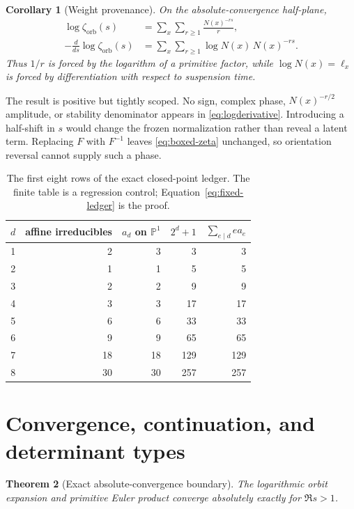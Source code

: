 \documentclass[11pt]{article}
\newtheorem{theorem}{Theorem}
\newtheorem{corollary}[theorem]{Corollary}
\theoremstyle{definition}
\theoremstyle{remark}
\begin{document}
\begin{corollary}[Weight provenance]
\label{cor:weights}
On the absolute-convergence half-plane,
\begin{align}
  \log\zeta_{\mathrm{orb}}(s)
   &=\sum_x\sum_{r\geq1}\frac{N(x)^{-rs}}r,
  \label{eq:logzeta}\\
  -\frac{d}{ds}\log\zeta_{\mathrm{orb}}(s)
   &=\sum_x\sum_{r\geq1}\log N(x)\,N(x)^{-rs}.
  \label{eq:logderivative}
\end{align}
Thus \(1/r\) is forced by the logarithm of a primitive factor, while
\(\log N(x)=\ell_x\) is forced by differentiation with respect to suspension
time.
\end{corollary}

The result is positive but tightly scoped.  No sign, complex phase,
\(N(x)^{-r/2}\) amplitude, or stability denominator appears in
\eqref{eq:logderivative}.  Introducing a half-shift in \(s\) would change the
frozen normalization rather than reveal a latent term.  Replacing \(F\) with
\(F^{-1}\) leaves \eqref{eq:boxed-zeta} unchanged, so orientation reversal
cannot supply such a phase.

\begin{table}[t]
\centering
\caption{The first eight rows of the exact closed-point ledger.  The finite
table is a regression control; Equation~\eqref{eq:fixed-ledger} is the proof.}
\label{tab:ledger}
\small
\begin{tabular}{@{}rrrrr@{}}
\toprule
\(d\) & affine irreducibles & \(a_d\) on \(\mathbb P^1\) & \(2^d+1\) & \(\sum_{e\mid d}e a_e\)\\
\midrule
1 & 2 & 3 & 3 & 3\\
2 & 1 & 1 & 5 & 5\\
3 & 2 & 2 & 9 & 9\\
4 & 3 & 3 & 17 & 17\\
5 & 6 & 6 & 33 & 33\\
6 & 9 & 9 & 65 & 65\\
7 & 18 & 18 & 129 & 129\\
8 & 30 & 30 & 257 & 257\\
\bottomrule
\end{tabular}
\end{table}

\section{Convergence, continuation, and determinant types}
\label{sec:analytic}

\begin{theorem}[Exact absolute-convergence boundary]
\label{thm:convergence}
The logarithmic orbit expansion and primitive Euler product converge
absolutely exactly for \(\Re s>1\).
\end{theorem}
\end{document}
